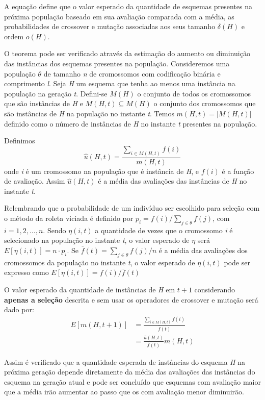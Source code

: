 A equação define que o valor esperado da quantidade de esquemas presentes na próxima população baseado em sua avaliação comparada com a média, as probabilidades de crossover e mutação associadas aos seus tamanho \(\delta(H)\) e ordem \(o(H)\).

O teorema pode ser verificado através da estimação do aumento ou diminuição das instâncias dos esquemas presentes na população. Consideremos uma população \(\theta\) de tamanho \textit{n} de cromossomos com codificação binária e comprimento \textit{l}. Seja \textit{H} um esquema que tenha ao menos uma instância na população na geração \textit{t}. Defini-se \(M(H)\) o conjunto de todos os cromossomos que são instâncias de \textit{H} e \(M(H, t) \subseteq M(H)\) o conjunto dos cromossomos que são instâncias de \textit{H} na população no instante \textit{t}. Temos \(m(H, t) = |M(H,t)|\) definido como o número de instâncias de \textit{H} no instante \textit{t} presentes na população. 

Definimos 
\[\hat{u}(H,t) = \frac{\sum\limits_{i \in M(H,t)}f(i)}{m(H,t)}\]
onde \textit{i} é um cromossomo na população que é instância de \textit{H}, e \(f(i)\) é a função de avaliação. Assim \(\hat{u}(H,t)\) é a média das avaliações das instâncias de \textit{H} no instante \textit{t}.

Relembrando que a probabilidade de um indivíduo ser escolhido para seleção com o método da roleta viciada é definido por \(p_i = f(i) / \sum_{j \in \theta}{f(j)}\), com \(i = 1,2,\dots,n\). Sendo \(\eta(i,t)\) a quantidade de vezes que o cromossomo \textit{i} é selecionado na população no instante \textit{t}, o valor esperado de \(\eta\) será \(E[\eta(i,t)] = n \cdot p_i\). Se \(\overline{f}(t) = \sum_{j \in \theta} {f(j)} / n\) é a média das avaliações dos cromossomos da população no instante \textit{t}, o valor esperado de \(\eta(i,t)\) pode ser expresso como \(E[\eta(i,t)] = f(i) / \overline{f}(t)\)

O valor esperado da quantidade de instâncias de \textit{H} em \(t+1\) considerando \textbf{apenas a seleção} descrita e sem usar os operadores de crossover e mutação será dado por:
\begin{align}
	E[m(H,t+1)] &= \frac{\sum\limits_{i \in M(H,t)} {f(i)}}{\overline{f}(t)} \nonumber \\
				&= \frac{\hat{u}(H,t)}{\overline{f}(t)} m(H,t)
\label{eq:valor_esperado_H}
\end{align}

Assim é verificado que a quantidade esperada de instâncias do esquema \textit{H} na próxima geração depende diretamente da média das avaliações das instâncias do esquema na geração atual e pode ser concluído que esquemas com avaliação maior que a média irão aumentar ao passo que os com avaliação menor diminuirão.

